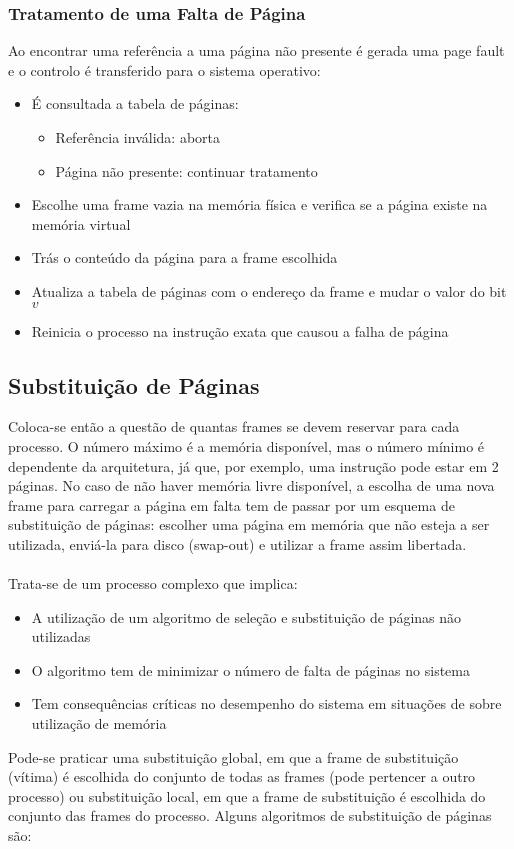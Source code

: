 \documentclass[10pt,a4paper]{report}
\begin{document}
\subsubsection{Tratamento de uma Falta de Página}
Ao encontrar uma referência a uma página não presente é gerada uma page fault e o controlo é transferido para o sistema operativo:
\begin{itemize}
\item É consultada a tabela de páginas:
\begin{itemize}
\item Referência inválida: aborta
\item Página não presente: continuar tratamento
\end{itemize}
\item Escolhe uma frame vazia na memória física e verifica se a página existe na memória virtual
\item Trás o conteúdo da página para a frame escolhida
\item Atualiza a tabela de páginas com o endereço da frame e mudar o valor do bit $v$
\item Reinicia o processo na instrução exata que causou
a falha de página
\end{itemize}
\subsection{Substituição de Páginas}
Coloca-se então a questão de quantas frames se devem reservar para cada processo. O número máximo é a memória disponível, mas o número mínimo é dependente da arquitetura, já que, por exemplo, uma instrução pode estar em 2 páginas. No caso de não haver memória livre disponível, a escolha de uma nova frame para carregar a página em falta tem de passar por um esquema de substituição de páginas: escolher uma página em memória que não esteja a ser utilizada, enviá-la para disco (swap-out) e utilizar a frame assim libertada.\\
\\
Trata-se de um processo complexo que implica:
\begin{itemize}
\item A utilização de um algoritmo de seleção e substituição de páginas não utilizadas
\item O algoritmo tem de minimizar o número de falta de páginas no sistema
\item Tem consequências críticas no desempenho do sistema em situações de sobre utilização de memória
\end{itemize}
Pode-se praticar uma substituição global, em que a frame de substituição (vítima) é escolhida do conjunto de todas as frames (pode pertencer a outro processo) ou substituição local, em que a frame de substituição é escolhida do conjunto das frames do processo. Alguns algoritmos de substituição de páginas são:
\end{document}
